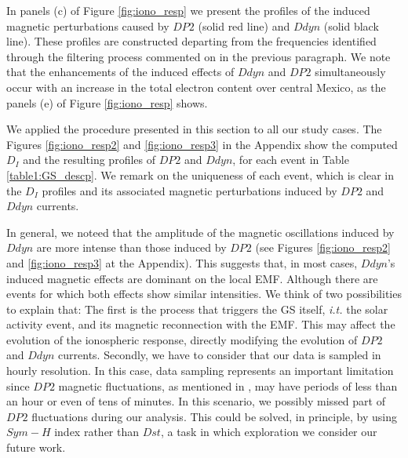 \documentclass[a4paper,fleqn]{cas-dc}
\begin{document}
In panels (c) of Figure \ref{fig:iono_resp} we present the profiles of the induced magnetic perturbations caused by $DP2$ (solid red line) and $Ddyn$ (solid black line). These profiles are constructed departing from the frequencies identified through the filtering process commented on in the previous paragraph. We note that the enhancements of the induced effects of $Ddyn$ and $DP2$ simultaneously occur with an increase in the total electron content over central Mexico, as the panels (e) of Figure \ref{fig:iono_resp} shows.

We applied the procedure presented in this section to all our study cases. The Figures \ref{fig:iono_resp2} and \ref{fig:iono_resp3} in the Appendix show the computed $D_I$ and the resulting profiles of $DP2$ and $Ddyn$, for each event in Table \ref{table1:GS_descp}. We remark on the uniqueness of each event, which is clear in the $D_I$ profiles and its associated magnetic perturbations induced by $DP2$ and $Ddyn$ currents.

In general, we noteed that the amplitude of the magnetic oscillations induced by $Ddyn$ are more intense than those induced by $DP2$ (see Figures \ref{fig:iono_resp2} and \ref{fig:iono_resp3} at the Appendix). This suggests that, in most cases, $Ddyn$'s induced magnetic effects are dominant on the local EMF. Although there are events for which both effects show similar intensities. We think of two possibilities to explain that: The first is the process that triggers the GS itself, \emph{i.t.} the solar activity event, and its magnetic reconnection with the EMF. This may affect the evolution of the ionospheric response, directly modifying the evolution of $DP2$ and $Ddyn$ currents. Secondly, we have to consider that our data is sampled in hourly resolution. In this case, data sampling represents an important limitation since $DP2$ magnetic fluctuations, as mentioned in \cite{nishida_68_fluctuations}, may have periods of less than an hour or even of tens of minutes. In this scenario, we possibly missed part of $DP2$ fluctuations during our analysis. This could be solved, in principle, by using $Sym-H$ index rather than $Dst$, a task in which exploration we consider our future work.

 


\end{document}
